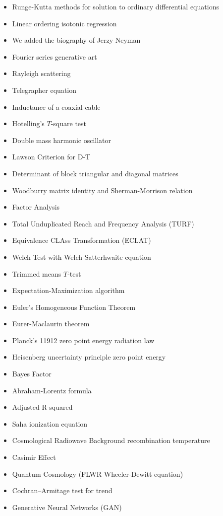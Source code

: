 \begin{itemize}
\begin{itemize}[noitemsep]
			\item Runge-Kutta methods for solution to ordinary differential equations
			\item Linear ordering isotonic regression
			\item We added the biography of Jerzy Neyman
			\item Fourier series generative art
			\item Rayleigh scattering
			\item Telegrapher equation
			\item Inductance of a coaxial cable
			\item Hotelling's $T$-square test
			\item Double mass harmonic oscillator
			\item Lawson Criterion for D-T
			\item Determinant of block triangular and diagonal matrices
			\item Woodburry matrix identity and Sherman-Morrison relation
			\item Factor Analysis
			\item Total Unduplicated Reach and Frequency Analysis (TURF)
			\item Equivalence CLAss Transformation (ECLAT)
			\item Welch Test with Welch-Satterhwaite equation
			\item Trimmed means $T$-test
			\item Expectation-Maximization algorithm
			\item Euler's Homogeneous Function Theorem
			\item Eurer-Maclaurin theorem
			\item Planck's 11912 zero point energy radiation law
			\item Heisenberg uncertainty principle zero point energy
			\item Bayes Factor
			\item Abraham-Lorentz formula
			\item Adjusted R-squared
			\item Saha ionization equation
			\item Cosmological Radiowave Background recombination temperature
			\item Casimir Effect
			\item Quantum Cosmology (FLWR Wheeler-Dewitt equation)
			\item Cochran–Armitage test for trend
			\item Generative Neural Networks (GAN)

\end{itemize}
\end{itemize}
